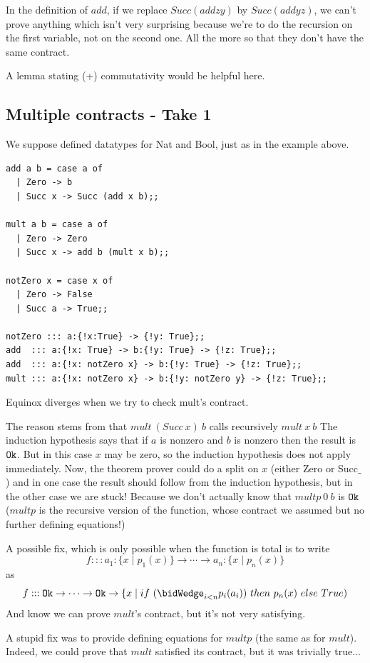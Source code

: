 \documentclass{article}
\begin{document}
In the definition of $add$, if we replace $Succ (add z y)$ by $Succ (add y z)$, we can't prove anything which isn't very surprising because we're to do the recursion on the first variable, not on the second one. All the more so that they don't have the same contract.

A lemma stating (+) commutativity would be helpful here.


\subsection{Multiple contracts - Take 1}
We suppose defined datatypes for Nat and Bool, just as in the example above.

\begin{verbatim}
add a b = case a of
  | Zero -> b
  | Succ x -> Succ (add x b);;

mult a b = case a of
  | Zero -> Zero
  | Succ x -> add b (mult x b);;

notZero x = case x of
  | Zero -> False
  | Succ a -> True;;

notZero ::: a:{!x:True} -> {!y: True};;
add  ::: a:{!x: True} -> b:{!y: True} -> {!z: True};;
add  ::: a:{!x: notZero x} -> b:{!y: True} -> {!z: True};;
mult ::: a:{!x: notZero x} -> b:{!y: notZero y} -> {!z: True};;
\end{verbatim}

Equinox diverges when we try to check mult's contract.

The reason stems from that $mult~(Succ~x)~b$ calls recursively
$mult~x~b$ The induction hypothesis says that if $a$ is nonzero and
$b$ is nonzero then the result is $\texttt{Ok}$. But in this case $x$ may be
zero, so the induction hypothesis does not apply immediately. Now, the
theorem prover could do a split on $x$ (either Zero or Succ$\_$) and
in one case the result should follow from the induction hypothesis,
but in the other case we are stuck! Because we don't actually know
that $multp~0~b$ is $\texttt{Ok}$ ($multp$ is the recursive version of the
function, whose contract we assumed but no further defining
equations!)

A possible fix, which is only possible when the function is total is
to write $$f ::: a_1:\{x \mid p_1(x) \} \to \cdots \to a_n:\{x \mid
p_n(x) \}$$ as $$f ::: \ok \to \cdots \to \ok \to \{x \mid
if~(\bidWedge_{i < n} p_i(a_i))~then~p_n(x)~else~True)$$ And know we
can prove $mult$'s contract, but it's not very satisfying.

A stupid fix was to provide defining equations for $multp$ (the same
as for $mult$). Indeed, we could prove that $mult$ satisfied its
contract, but it was trivially true...
\end{document}
